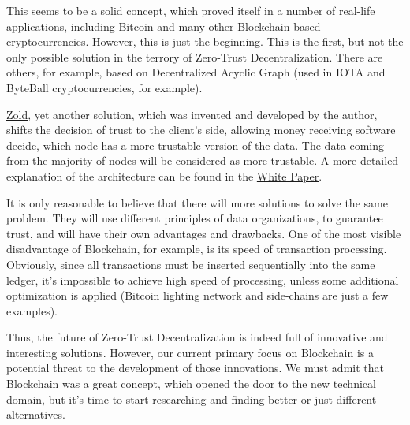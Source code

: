 \documentclass{main}
\begin{document}
This seems to be a solid concept, which proved itself in a number of real-life
applications, including Bitcoin and many other Blockchain-based cryptocurrencies.
However, this is just the beginning. This is the first, but not the only
possible solution in the terrory of Zero-Trust Decentralization. There
are others, for example, based on Decentralized Acyclic Graph (used in
IOTA and ByteBall cryptocurrencies, for example).

\href{https://www.zold.io}{Zold}, yet another solution, which was invented and
developed by the author, shifts
the decision of trust to the client's side, allowing money receiving
software decide, which node has a more trustable version of the data. The data
coming from the majority of nodes will be considered as more trustable.
A more detailed explanation of the architecture can be found in the
\href{https://papers.zold.io/wp.pdf}{White Paper}.

It is only reasonable to believe that there will more solutions to solve
the same problem. They will use different principles of data organizations,
to guarantee trust, and will have their own advantages and drawbacks. One of the
most visible disadvantage of Blockchain, for example, is its speed of transaction processing.
Obviously, since all transactions must be inserted
sequentially into the same ledger, it's impossible to achieve high speed
of processing, unless some additional optimization is applied
(Bitcoin lighting network and side-chains are just a few examples).

Thus, the future of Zero-Trust Decentralization is indeed full of innovative
and interesting solutions. However, our current primary focus on Blockchain is
a potential threat to the development of those innovations. We must
admit that Blockchain was a great concept, which opened the door to the
new technical domain, but it's time to start researching and finding
better or just different alternatives.
\end{document}
